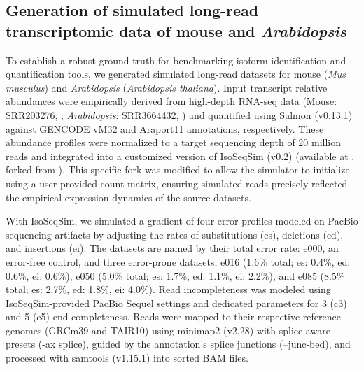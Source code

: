 \subsection{Generation of simulated long-read transcriptomic data of mouse and \emph{Arabidopsis}}\label{generation-of-simulated-long-read-transcriptomic-data-of-mouse-and-arabidopsis}

To establish a robust ground truth for benchmarking isoform identification and quantification tools, we generated simulated long-read datasets for mouse (\emph{Mus musculus}) and \emph{Arabidopsis} (\emph{Arabidopsis thaliana}). Input transcript relative abundances were empirically derived from high-depth RNA-seq data (Mouse: SRR203276, \citealp{grabherr2011}; \emph{Arabidopsis}: SRR3664432, \citealp{li2016}) and quantified using Salmon (v0.13.1) \citep{patro2017} against GENCODE vM32 \citep{gencodendc} and Araport11 \citep{cheng2017} annotations, respectively. These abundance profiles were normalized to a target sequencing depth of 20 million reads and integrated into a customized version of IsoSeqSim (v0.2) (available at \citealp{isoseqsimnd}, forked from \citealp{wangnd}). This specific fork was modified to allow the simulator to initialize using a user-provided count matrix, ensuring simulated reads precisely reflected the empirical expression dynamics of the source datasets.

With IsoSeqSim, we simulated a gradient of four error profiles modeled on PacBio sequencing artifacts by adjusting the rates of substitutions (es), deletions (ed), and insertions (ei). The datasets are named by their total error rate: e000, an error-free control, and three error-prone datasets, e016 (1.6\% total; es: 0.4\%, ed: 0.6\%, ei: 0.6\%), e050 (5.0\% total; es: 1.7\%, ed: 1.1\%, ei: 2.2\%), and e085 (8.5\% total; es: 2.7\%, ed: 1.8\%, ei: 4.0\%). Read incompleteness was modeled using IsoSeqSim-provided PacBio Sequel settings and dedicated parameters for 3\p{} (c3) and 5\p{} (c5) end completeness. Reads were mapped to their respective reference genomes (GRCm39 and TAIR10) using minimap2 (v2.28) \citep{li2018} with splice-aware presets (-ax splice), guided by the annotation's splice junctions (--junc-bed), and processed with samtools (v1.15.1) \citep{li2009} into sorted BAM files.

